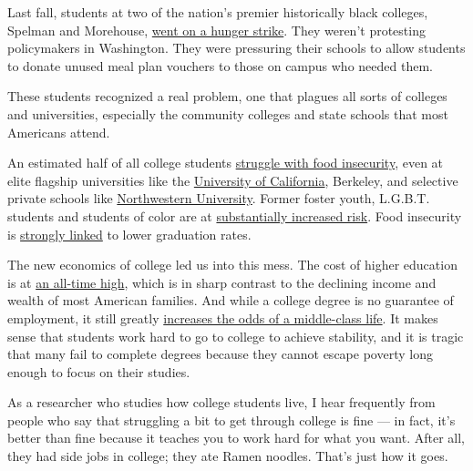 Last fall, students at two of the nation's premier historically black
colleges, Spelman and Morehouse,
\href{https://www.bustle.com/p/spelman-morehouse-students-are-going-on-hunger-strike-to-protest-food-insecurity-on-college-campuses-3242622}{went
on a hunger strike}. They weren't protesting policymakers in Washington.
They were pressuring their schools to allow students to donate unused
meal plan vouchers to those on campus who needed them.

These students recognized a real problem, one that plagues all sorts of
colleges and universities, especially the community colleges and state
schools that most Americans attend.

An estimated half of all college students
\href{http://journals.sagepub.com/doi/abs/10.3102/0013189X17741303?ai=1gvoi\&mi=3ricys\&af=R}{struggle
with food insecurity}, even at elite flagship universities like the
\href{https://alumni.berkeley.edu/california-magazine/just-in/2016-05-11/hunger-uc-berkeley-sizeable-share-students-are-financially}{University
of California}, Berkeley, and selective private schools like
\href{http://www.swipehunger.org/northwestern}{Northwestern University}.
Former foster youth, L.G.B.T. students and students of color are at
\href{http://www.ucop.edu/global-food-initiative/_files/food-housing-security.pdf}{substantially
increased risk}. Food insecurity is
\href{http://www.tandfonline.com/doi/full/10.1080/00091383.2016.1121081?scroll=top\&needAccess=true\&}{strongly
linked} to lower graduation rates.

The new economics of college led us into this mess. The cost of higher
education is at
\href{http://time.com/money/4543839/college-costs-record-2016/}{an
all-time high}, which is in sharp contrast to the declining income and
wealth of most American families. And while a college degree is no
guarantee of employment, it still greatly
\href{https://cew.georgetown.edu/cew-reports/americas-divided-recovery/}{increases
the odds of a middle-class life}. It makes sense that students work hard
to go to college to achieve stability, and it is tragic that many fail
to complete degrees because they cannot escape poverty long enough to
focus on their studies.

As a researcher who studies how college students live, I hear frequently
from people who say that struggling a bit to get through college is fine
--- in fact, it's better than fine because it teaches you to work hard
for what you want. After all, they had side jobs in college; they ate
Ramen noodles. That's just how it goes.

